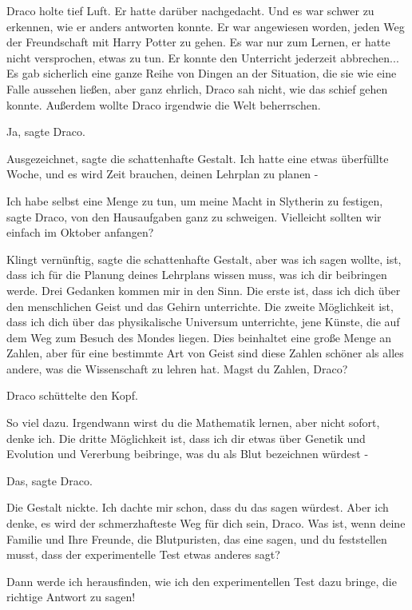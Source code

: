 Draco holte tief Luft. Er hatte darüber nachgedacht. Und es war schwer zu
erkennen, wie er anders antworten konnte. Er war angewiesen worden, jeden Weg
der Freundschaft mit Harry Potter zu gehen. Es war nur zum Lernen, er hatte
nicht versprochen, etwas zu tun. Er konnte den Unterricht jederzeit abbrechen...
Es gab sicherlich eine ganze Reihe von Dingen an der Situation, die sie wie eine
Falle aussehen ließen, aber ganz ehrlich, Draco sah nicht, wie das schief gehen
konnte. Außerdem wollte Draco irgendwie die Welt beherrschen.

\glqq{}Ja\grqq{}, sagte Draco.

\glqq{}Ausgezeichnet\grqq{}, sagte die schattenhafte Gestalt. \glqq{}Ich hatte
eine etwas überfüllte Woche, und es wird Zeit brauchen, deinen Lehrplan zu
planen -\grqq{}

\glqq{}Ich habe selbst eine Menge zu tun, um meine Macht in Slytherin zu
festigen\grqq{}, sagte Draco, \glqq{}von den Hausaufgaben ganz zu schweigen.
Vielleicht sollten wir einfach im Oktober anfangen?\grqq{}

\glqq{}Klingt vernünftig\grqq{}, sagte die schattenhafte Gestalt, \glqq{}aber was
ich sagen wollte, ist, dass ich für die Planung deines Lehrplans wissen muss,
was ich dir beibringen werde. Drei Gedanken kommen mir in den Sinn. Die erste
ist, dass ich dich über den menschlichen Geist und das Gehirn unterrichte. Die
zweite Möglichkeit ist, dass ich dich über das physikalische Universum
unterrichte, jene Künste, die auf dem Weg zum Besuch des Mondes liegen. Dies
beinhaltet eine große Menge an Zahlen, aber für eine bestimmte Art von Geist
sind diese Zahlen schöner als alles andere, was die Wissenschaft zu lehren hat.
Magst du Zahlen, Draco?\grqq{}

Draco schüttelte den Kopf.

\glqq{}So viel dazu. Irgendwann wirst du die Mathematik lernen, aber nicht
sofort, denke ich. Die dritte Möglichkeit ist, dass ich dir etwas über Genetik
und Evolution und Vererbung beibringe, was du als Blut bezeichnen würdest
-\grqq{}

\glqq{}Das\grqq{}, sagte Draco.

Die Gestalt nickte. \glqq{}Ich dachte mir schon, dass du das sagen würdest. Aber
ich denke, es wird der schmerzhafteste Weg für dich sein, Draco. Was ist, wenn
deine Familie und Ihre Freunde, die Blutpuristen, das eine sagen, und du
feststellen musst, dass der experimentelle Test etwas anderes sagt?\grqq{}

\glqq{}Dann werde ich herausfinden, wie ich den experimentellen Test dazu bringe,
die richtige Antwort zu sagen!\grqq{}

